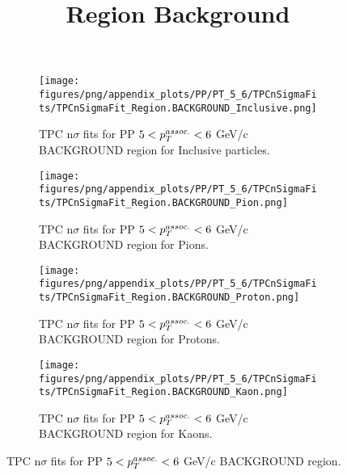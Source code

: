             \begin{figure}[H]
                \title{Region Background}
                \begin{subfigure}[b]{0.5\textwidth}
                    \centering
                    \texttt{[image: figures/png/appendix\_plots/PP/PT\_5\_6/TPCnSigmaFits/TPCnSigmaFit\_Region.BACKGROUND\_Inclusive.png]}
                    \caption{TPC n$\sigma$ fits for PP $5 < \pTassoc < 6$ GeV/c BACKGROUND region for Inclusive particles.}
                    \label{fig:appendix_PP_$5 < \pTassoc < 6$ GeV/c_BACKGROUND_Inclusive}
                \end{subfigure}
                \begin{subfigure}[b]{0.5\textwidth}
                    \centering
                    \texttt{[image: figures/png/appendix\_plots/PP/PT\_5\_6/TPCnSigmaFits/TPCnSigmaFit\_Region.BACKGROUND\_Pion.png]}
                    \caption{TPC n$\sigma$ fits for PP $5 < \pTassoc < 6$ GeV/c BACKGROUND region for Pions.}
                    \label{fig:appendix_PP_$5 < \pTassoc < 6$ GeV/c_BACKGROUND_Pion}
                \end{subfigure}
                \begin{subfigure}[b]{0.5\textwidth}
                    \centering
                    \texttt{[image: figures/png/appendix\_plots/PP/PT\_5\_6/TPCnSigmaFits/TPCnSigmaFit\_Region.BACKGROUND\_Proton.png]}
                    \caption{TPC n$\sigma$ fits for PP $5 < \pTassoc < 6$ GeV/c BACKGROUND region for Protons.}
                    \label{fig:appendix_PP_$5 < \pTassoc < 6$ GeV/c_BACKGROUND_Proton}
                \end{subfigure}
                \begin{subfigure}[b]{0.5\textwidth}
                    \centering
                    \texttt{[image: figures/png/appendix\_plots/PP/PT\_5\_6/TPCnSigmaFits/TPCnSigmaFit\_Region.BACKGROUND\_Kaon.png]}
                    \caption{TPC n$\sigma$ fits for PP $5 < \pTassoc < 6$ GeV/c BACKGROUND region for Kaons.}
                    \label{fig:appendix_PP_$5 < \pTassoc < 6$ GeV/c_BACKGROUND_Kaon}
                \end{subfigure}
                \caption{TPC n$\sigma$ fits for PP $5 < \pTassoc < 6$ GeV/c BACKGROUND region.}
                \label{fig:appendix_PP_$5 < \pTassoc < 6$ GeV/c_BACKGROUND}
            \end{figure}
            \clearpage
            
